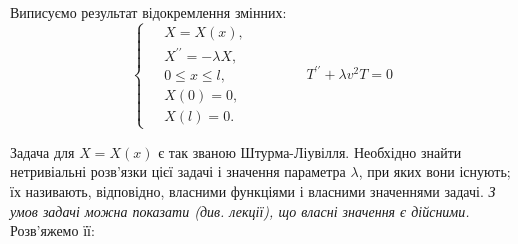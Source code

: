 \documentclass[a4paper, 14pt]{extreport}
\begin{document}
Виписуємо результат відокремлення змінних:
\begin{equation} \label{sepvar}
    \left\{ \begin{aligned}
        \;&X = X(x), \\  &X^{\prime\prime} = -\lambda X, \\ &0 \leq x \leq l, \\  &X(0) = 0, \\ &X(l) = 0. 
    \end{aligned} \right.
    \qquad\qquad
    T^{\prime\prime} + \lambda v^2 T = 0
\end{equation}

Задача для $X = X(x)$ є так званою Штурма-Ліувілля. Необхідно знайти нетривіальні розв'язки цієї задачі і значення параметра   $\lambda$, при яких вони існують; їх називають, відповідно, власними функціями і власними значеннями задачі. \textit{З умов задачі можна показати (див. лекції), що власні значення є дійсними.}\\
Розв'яжемо її:
\end{document}
